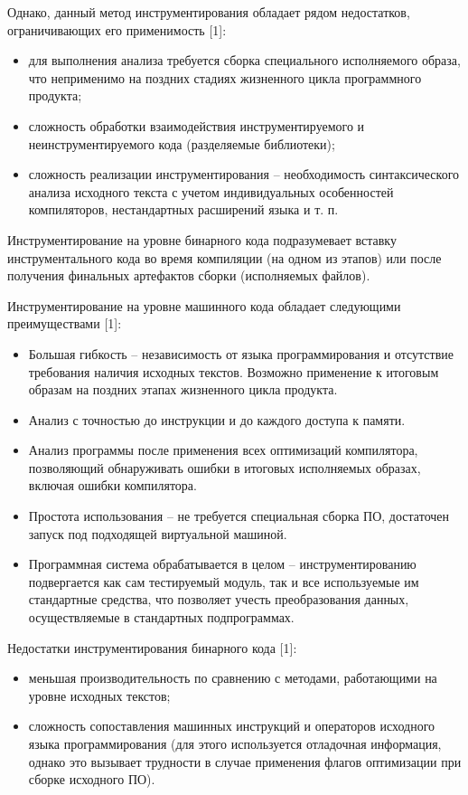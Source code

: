 Однако, данный метод инструментирования обладает рядом недостатков, ограничивающих его применимость [1]:
\begin{itemize}
  \item для выполнения анализа требуется сборка специального исполняемого образа, что неприменимо на поздних стадиях жизненного цикла программного продукта;
  \item сложность обработки взаимодействия инструментируемого и неинструментируемого кода (разделяемые библиотеки);
  \item сложность реализации инструментирования -- необходимость синтаксического анализа исходного текста с учетом индивидуальных особенностей компиляторов, нестандартных расширений языка и т. п.
\end{itemize}

Инструментирование на уровне бинарного кода подразумевает вставку инструментального кода во время компиляции (на одном из этапов) или после получения финальных артефактов сборки (исполняемых файлов).

Инструментирование на уровне машинного кода обладает следующими преимуществами [1]:
\begin{itemize}
  \item Большая гибкость -- независимость от языка программирования и отсутствие требования наличия исходных текстов. Возможно применение к итоговым образам на поздних этапах жизненного цикла продукта.
  \item Анализ с точностью до инструкции и до каждого доступа к памяти.
  \item Анализ программы после применения всех оптимизаций компилятора, позволяющий обнаруживать ошибки в итоговых исполняемых образах, включая ошибки компилятора.
  \item Простота использования -- не требуется специальная сборка ПО, достаточен запуск под подходящей виртуальной машиной.
  \item Программная система обрабатывается в целом -- инструментированию подвергается как сам тестируемый модуль, так и все используемые им стандартные средства, что позволяет учесть преобразования данных, осуществляемые в стандартных подпрограммах.
\end{itemize}

Недостатки инструментирования бинарного кода [1]:
\begin{itemize}
  \item меньшая производительность по сравнению с методами, работающими на уровне исходных текстов;
  \item сложность сопоставления машинных инструкций и операторов исходного языка программирования (для этого используется отладочная информация, однако это вызывает трудности в случае применения флагов оптимизации при сборке исходного ПО).
\end{itemize}

